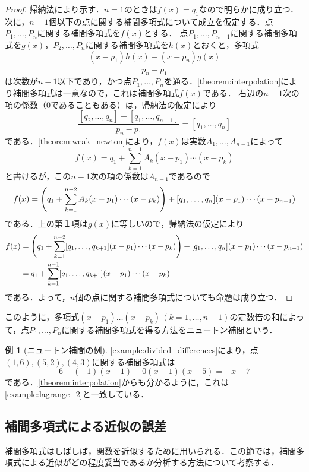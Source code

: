 \documentclass[a4paper]{ltjsarticle}
\theoremstyle{definition}
\newtheorem{example}{例}[section]
\DeclarePairedDelimiter{\pqty}{\lparen}{\rparen}
\begin{document}
\begin{proof}
  帰納法により示す．$n=1$のときは$f(x)=q_1$なので明らかに成り立つ．
  次に，$n-1$個以下の点に関する補間多項式について成立を仮定する．点$P_1,\dots,P_n$に関する補間多項式を$f(x)$とする．
  点$P_1, \dots, P_{n-1}$に関する補間多項式を$g(x)$，$P_2, \dots, P_n$に関する補間多項式を$h(x)$とおくと，多項式
  \[
     \frac{(x-p_1)h(x) - (x-p_n)g(x)}{p_n-p_1}
  \]
  は次数が$n-1$以下であり，かつ点$P_1,\dots,P_n$を通る．\cref{theorem:interpolation}により補間多項式は一意なので，これは補間多項式$f(x)$である．
  右辺の$n-1$次の項の係数（$0$であることもある）は，帰納法の仮定により
  \[
    \frac{[q_2,\dots,q_n]-[q_1,\dots,q_{n-1}]}{p_n-p_1} = [q_1,\dots,q_n]
  \]
  である．\cref{theorem:weak_newton}により，$f(x)$は実数$A_1,\dots,A_{n-1}$によって
  \[
    f(x) = q_1 + \sum_{k=1}^{n-1} A_k(x-p_1)\cdots (x-p_k)
  \]
  と書けるが，この$n-1$次の項の係数は$A_{n-1}$であるので
  \[
    f(x) = \pqty*{q_1 + \sum_{k=1}^{n-2} A_k(x-p_1)\cdots (x-p_k)} + [q_1,\dots,q_n](x-p_1)\cdots (x-p_{n-1})
  \]
  である．上の第１項は$g(x)$に等しいので，帰納法の仮定により
  \begin{align*}
    f(x)
    &= \pqty*{q_1 + \sum_{k=1}^{n-2} [q_1,\dots,q_{k+1}](x-p_1)\cdots (x-p_k)} + [q_1,\dots,q_n](x-p_1)\cdots (x-p_{n-1}) \\
    &= q_1 + \sum_{k=1}^{n-1} [q_1,\dots,q_{k+1}](x-p_1)\cdots (x-p_k)
  \end{align*}
  である．よって，$n$個の点に関する補間多項式についても命題は成り立つ．
\end{proof}

このように，多項式$(x-p_1) \dots (x-p_k)\,(k=1,\dots,n-1)$の定数倍の和によって，点$P_1,\dots,P_n$に関する補間多項式を得る方法をニュートン補間という．

\begin{example}[ニュートン補間の例]
  \cref{example:divided_differences}により，点$(1,6),(5,2),(4,3)$に関する補間多項式は
  \[
    6+(-1)(x-1)+0(x-1)(x-5) = -x+7
  \]
  である．\cref{theorem:interpolation}からも分かるように，これは\cref{example:lagrange_2}と一致している．
\end{example}

\subsection{補間多項式による近似の誤差}

補間多項式はしばしば，関数を近似するために用いられる．この節では，補間多項式による近似がどの程度妥当であるか分析する方法について考察する．
\end{document}
